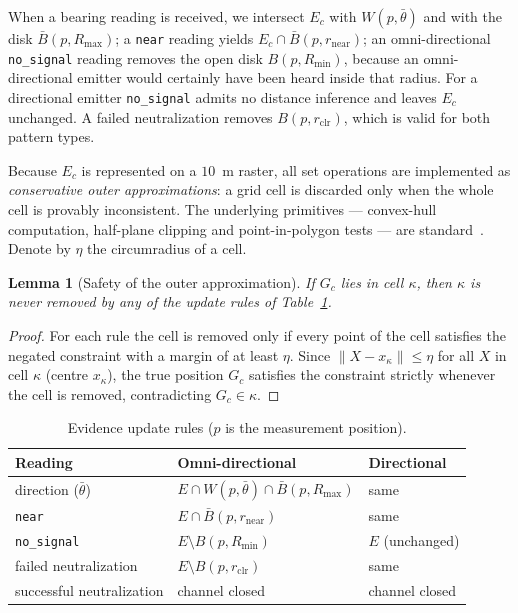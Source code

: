 \documentclass[journal,10pt]{IEEEtran}
\newtheorem{lemma}[theorem]{Lemma}
\theoremstyle{definition}
\newcommand{\Rmin}{R_{\min}}
\newcommand{\Rmax}{R_{\max}}
\begin{document}
When a bearing reading is received, we intersect $E_c$ with $W(p,\bar\theta)$ and with the disk
$\bar B(p,\Rmax)$; a \texttt{near} reading yields $E_c\cap\bar B(p,r_{\mathrm{near}})$; an
omni-directional \texttt{no\_signal} reading removes the open disk $B(p,\Rmin)$, because an
omni-directional emitter would certainly have been heard inside that radius. For a directional
emitter \texttt{no\_signal} admits no distance inference and leaves $E_c$ unchanged. A failed
neutralization removes $B(p,r_{\mathrm{clr}})$, which is valid for both pattern types.

Because $E_c$ is represented on a $10$~m raster, all set operations are implemented as
\emph{conservative outer approximations}: a grid cell is discarded only when the whole cell is
provably inconsistent. The underlying primitives --- convex-hull computation, half-plane clipping
and point-in-polygon tests --- are standard~\cite{preparata1985}. Denote by $\eta$ the
circumradius of a cell.

\begin{lemma}[Safety of the outer approximation]
\label{lem:outer}
If $G_c$ lies in cell $\kappa$, then $\kappa$ is never removed by any of the update rules of
Table~\ref{tab:ops}.
\end{lemma}
\begin{proof}
For each rule the cell is removed only if every point of the cell satisfies the negated
constraint with a margin of at least $\eta$. Since $\|X-x_\kappa\|\le\eta$ for all $X$ in cell
$\kappa$ (centre $x_\kappa$), the true position $G_c$ satisfies the constraint strictly whenever
the cell is removed, contradicting $G_c\in\kappa$.
\end{proof}

\begin{table}[t]
\caption{Evidence update rules ($p$ is the measurement position).}
\label{tab:ops}
\centering
\small
\begin{tabular}{lll}
\toprule
Reading & Omni-directional & Directional \\
\midrule
direction ($\bar\theta$) & $E\cap W(p,\bar\theta)\cap\bar B(p,\Rmax)$ & same \\
\texttt{near} & $E\cap\bar B(p,r_{\mathrm{near}})$ & same \\
\texttt{no\_signal} & $E\setminus B(p,\Rmin)$ & $E$ (unchanged) \\
failed neutralization & $E\setminus B(p,r_{\mathrm{clr}})$ & same \\
successful neutralization & channel closed & channel closed \\
\bottomrule
\end{tabular}
\end{table}
\end{document}
